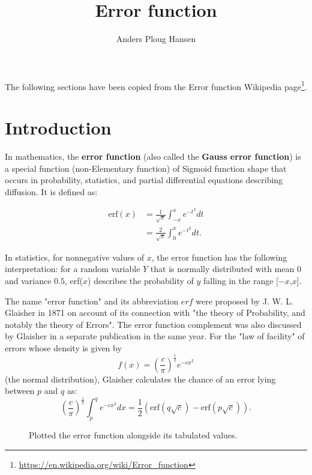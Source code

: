 \documentclass[twocolumn]{article}
\begin{document}
\title{Error function}
\author{Anders Ploug Hansen}

\maketitle

The following sections have been copied from the Error function Wikipedia page\footnote{\url{https://en.wikipedia.org/wiki/Error_function}}.

\section{Introduction}
In mathematics, the \textbf{error function} (also called the \textbf{Gauss error function}) is a special function (non-Elementary function) of Sigmoid function shape that occurs in probability, statistics, and partial differential equations describing diffusion. It is defined as:


\begin{align}
\mathrm{erf}(x) & = \frac{1}{\sqrt{\pi}}\int_{-x}^x e^{-t^2} dt \\
& = \frac{2}{\sqrt{\pi}}\int_0^x e^{-t^2} dt.
\end{align} 


In statistics, for nonnegative values of $x$, the error function has the following interpretation: for a random variable $Y$ that is normally distributed with mean $0$ and variance $0.5$, erf($x$) describes the probability of $y$ falling in the range [$-x$,$x$].

The name "error function" and its abbreviation $erf$ were proposed by J. W. L. Glaisher in 1871 on account of its connection with "the theory of Probability, and notably the theory of Errors". The error function complement was also discussed by Glaisher in a separate publication in the same year. For the "law of facility" of errors whose density is given by 
\begin{equation}
f(x)=\left(\frac{c}{\pi}\right)^{\frac{1}{2}}e^{-cx^2}
\end{equation}
(the normal distribution), Glaisher calculates the chance of an error lying between $p$ and $q$ as:
\begin{equation}
\left(\frac{c}{\pi}\right)^{\frac{1}{2}} \int_p^qe^{-cx^2}dx =\frac{1}{2}\left(\mathrm{erf} (q\sqrt{c}) -\mathrm{erf} (p\sqrt{c})\right)\mathrm{.}
\end{equation}


\begin{figure}
	
	\caption{Plotted the error function alongside its tabulated values.}
	\label{fig:erf}
\end{figure}
\end{document}
